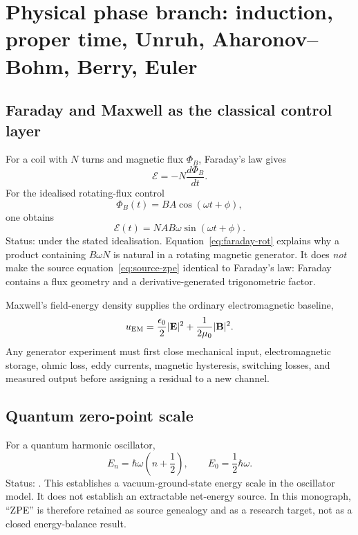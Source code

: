 \section{Physical phase branch: induction, proper time, Unruh, Aharonov--Bohm, Berry, Euler}

\subsection{Faraday and Maxwell as the classical control layer}

For a coil with \(N\) turns and magnetic flux \(\Phi_B\), Faraday's law gives
\begin{equation}
\boxed{\mathcal E=-N\frac{d\Phi_B}{dt}.}
\end{equation}
For the idealised rotating-flux control
\begin{equation}
\Phi_B(t)=BA\cos(\omega t+\phi),
\end{equation}
one obtains
\begin{equation}
\boxed{\mathcal E(t)=NAB\omega\sin(\omega t+\phi).}
\label{eq:faraday-rot}
\end{equation}
Status:  under the stated idealisation. Equation~\eqref{eq:faraday-rot} explains why a product containing \(B\omega N\) is natural in a rotating magnetic generator. It does \emph{not} make the source equation~\eqref{eq:source-zpe} identical to Faraday's law: Faraday contains a flux geometry and a derivative-generated trigonometric factor.

Maxwell's field-energy density supplies the ordinary electromagnetic baseline,
\begin{equation}
 u_{\rm EM}=\frac{\epsilon_0}{2}|\mathbf E|^2+\frac{1}{2\mu_0}|\mathbf B|^2.
\end{equation}
Any generator experiment must first close mechanical input, electromagnetic storage, ohmic loss, eddy currents, magnetic hysteresis, switching losses, and measured output before assigning a residual to a new channel.

\subsection{Quantum zero-point scale}

For a quantum harmonic oscillator,
\begin{equation}
E_n=\hbar\omega\left(n+\frac12\right),
\qquad
\boxed{E_0=\frac12\hbar\omega}.
\end{equation}
Status: . This establishes a vacuum-ground-state energy scale in the oscillator model. It does not establish an extractable net-energy source. In this monograph, ``ZPE'' is therefore retained as source genealogy and as a research target, not as a closed energy-balance result.


